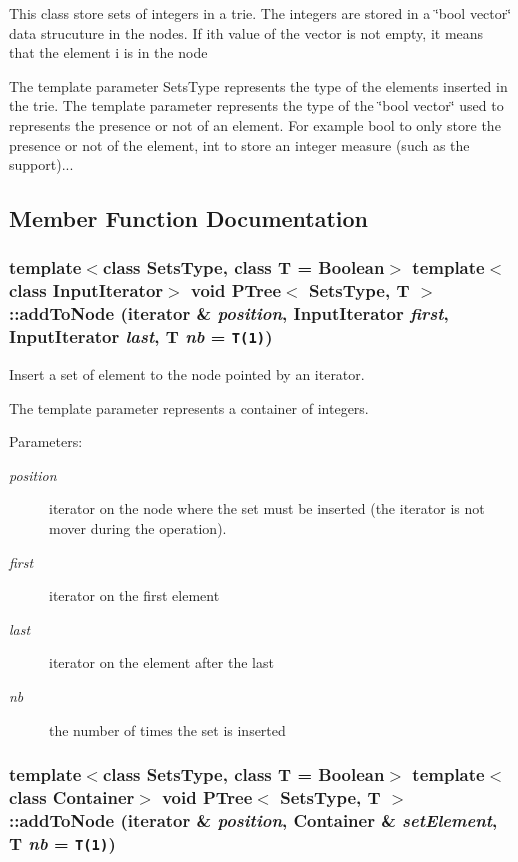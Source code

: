 This class store sets of integers in a trie. The integers are stored in a \char`\"{}bool vector\char`\"{} data strucuture in the nodes. If ith value of the vector is not empty, it means that the element i is in the node

The template parameter Sets\-Type represents the type of the elements inserted in the trie. The template parameter represents the type of the \char`\"{}bool vector\char`\"{} used to represents the presence or not of an element. For example bool to only store the presence or not of the element, int to store an integer measure (such as the support)... 



\subsection{Member Function Documentation}
\subsubsection{\setlength{\rightskip}{0pt plus 5cm}template$<$class Sets\-Type, class T = Boolean$>$ template$<$class Input\-Iterator$>$ void {\bf PTree}$<$ Sets\-Type, T $>$::add\-To\-Node ({\bf iterator} \& {\em position}, Input\-Iterator {\em first}, Input\-Iterator {\em last}, T {\em nb} = {\tt T(1)})\hspace{0.3cm}{\tt  [inline]}}\label{class_p_tree_cbf41b66e32c5de9230f93d03c5785af}


Insert a set of element to the node pointed by an iterator. 

The template parameter represents a container of integers. \begin{Desc}
\item[Parameters:]
\begin{description}
\item[{\em position}]iterator on the node where the set must be inserted (the iterator is not mover during the operation). \item[{\em first}]iterator on the first element \item[{\em last}]iterator on the element after the last \item[{\em nb}]the number of times the set is inserted \end{description}
\end{Desc}
\subsubsection{\setlength{\rightskip}{0pt plus 5cm}template$<$class Sets\-Type, class T = Boolean$>$ template$<$class Container$>$ void {\bf PTree}$<$ Sets\-Type, T $>$::add\-To\-Node ({\bf iterator} \& {\em position}, Container \& {\em set\-Element}, T {\em nb} = {\tt T(1)})\hspace{0.3cm}{\tt  [inline]}}\label{class_p_tree_09c1a7a6dec73c9cb75420f4d9c5a161}


